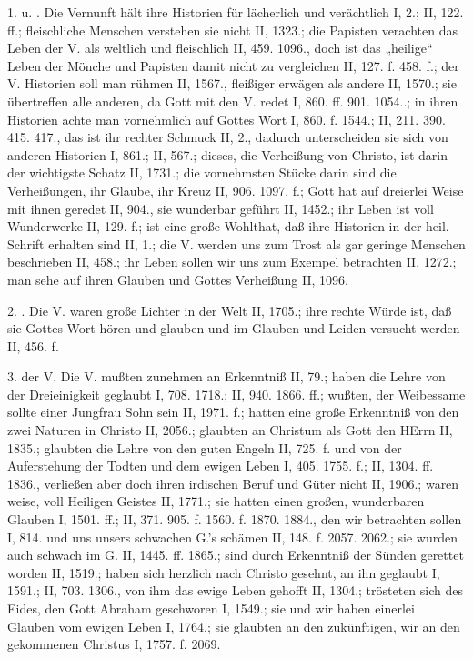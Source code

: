 1.  u. . Die Vernunft hält ihre Historien für lächerlich und verächtlich I, 2.; II, 122. ff.; fleischliche Menschen verstehen sie nicht II, 1323.; die Papisten verachten das Leben der V. als weltlich und fleischlich II, 459. 1096., doch ist das „heilige“ Leben der Mönche und Papisten damit nicht zu vergleichen II, 127. f. 458. f.; der V. Historien soll man rühmen II, 1567., fleißiger erwägen als andere II, 1570.; sie übertreffen alle anderen, da Gott mit den V. redet I, 860. ff. 901. 1054..; in ihren Historien achte man vornehmlich auf Gottes Wort I, 860. f. 1544.; II, 211. 390. 415. 417., das ist ihr rechter Schmuck II, 2., dadurch unterscheiden sie sich von anderen Historien I, 861.; II, 567.; dieses, die Verheißung von Christo, ist darin der wichtigste Schatz II, 1731.; die vornehmsten Stücke darin sind die Verheißungen, ihr Glaube, ihr Kreuz II, 906. 1097. f.; Gott hat auf dreierlei Weise mit ihnen geredet II, 904., sie wunderbar geführt II, 1452.; ihr Leben ist voll Wunderwerke II, 129. f.; ist eine große Wohlthat, daß ihre Historien in der heil. Schrift erhalten sind II, 1.; die V. werden uns zum Trost als gar geringe Menschen beschrieben II, 458.; ihr Leben sollen wir uns zum Exempel betrachten II, 1272.; man sehe auf ihren Glauben und Gottes Verheißung II, 1096.

2. . Die V. waren große Lichter in der Welt II, 1705.; ihre rechte Würde ist, daß sie Gottes Wort hören und glauben und im Glauben und Leiden versucht werden II, 456. f.

3.  der V. Die V. mußten zunehmen an Erkenntniß II, 79.; haben die Lehre von der Dreieinigkeit geglaubt I, 708. 1718.; II, 940. 1866. ff.; wußten, der Weibessame sollte einer Jungfrau Sohn sein II, 1971. f.; hatten eine große Erkenntniß von den zwei Naturen in Christo II, 2056.; glaubten an Christum als Gott den HErrn II, 1835.; glaubten die Lehre von den guten Engeln II, 725. f. und von der Auferstehung der Todten und dem ewigen Leben I, 405. 1755. f.; II, 1304. ff. 1836., verließen aber doch ihren irdischen Beruf und Güter nicht II, 1906.; waren weise, voll Heiligen Geistes II, 1771.; sie hatten einen großen, wunderbaren Glauben I, 1501. ff.; II, 371. 905. f. 1560. f. 1870. 1884., den wir betrachten sollen I, 814. und uns unsers schwachen G.’s schämen II, 148. f. 2057. 2062.; sie wurden auch schwach im G. II, 1445. ff. 1865.; sind durch Erkenntniß der Sünden gerettet worden II, 1519.; haben sich herzlich nach Christo gesehnt, an ihn geglaubt I, 1591.; II, 703. 1306., von ihm das ewige Leben gehofft II, 1304.; trösteten sich des Eides, den Gott Abraham geschworen I, 1549.; sie und wir haben einerlei Glauben vom ewigen Leben I, 1764.; sie glaubten an den zukünftigen, wir an den gekommenen Christus I, 1757. f. 2069.

